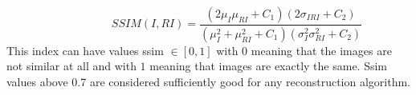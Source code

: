 \begin{equation} \label{eq:ssim2}
\hspace{3em} \hspace{3em} \hspace{3em} SSIM(I,RI)= \frac{(2\mu_{I} \mu_{RI} + C_1)(2\sigma_{IRI}+C_2)}{(\mu_{I}^2 + \mu_{RI}^2 + C_1)(\sigma_{I}^2 \sigma_{RI}^2 + C_2)}   \enspace \enspace \hspace{3em}
\end{equation}
This index can have values ssim $\in [0,1]$ with $0$ meaning that the images are not similar at all and with $1$ meaning that images are exactly the same. Ssim values above 0.7 are considered sufficiently good for any reconstruction algorithm.  

\FloatBarrier

    
 


  
